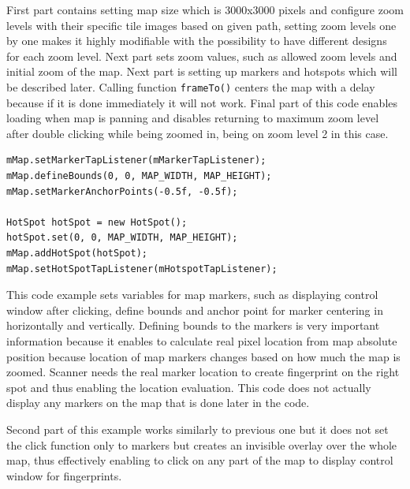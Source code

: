 First part contains setting map size which is 3000x3000 pixels and configure zoom levels with their specific tile images based on given path, setting zoom levels one by one makes it highly modifiable with the possibility to have different designs for each zoom level. Next part sets zoom values, such as allowed zoom levels and initial zoom of the map. Next part is setting up markers and hotspots which will be described later. Calling function \verb|frameTo()| centers the map with a delay because if it is done immediately it will not work. Final part of this code enables loading when map is panning and disables returning to maximum zoom level after double clicking while being zoomed in, being on zoom level 2 in this case.

\begin{lstlisting}[caption=Setup markers and hotspots]
mMap.setMarkerTapListener(mMarkerTapListener);
mMap.defineBounds(0, 0, MAP_WIDTH, MAP_HEIGHT);
mMap.setMarkerAnchorPoints(-0.5f, -0.5f);

HotSpot hotSpot = new HotSpot();
hotSpot.set(0, 0, MAP_WIDTH, MAP_HEIGHT);
mMap.addHotSpot(hotSpot);
mMap.setHotSpotTapListener(mHotspotTapListener);
\end{lstlisting}

This code example sets variables for map markers, such as displaying control window after clicking, define bounds and anchor point for marker centering in horizontally and vertically. Defining bounds to the markers is very important information because it enables to calculate real pixel location from map absolute position because location of map markers changes based on how much the map is zoomed. Scanner needs the real marker location to create fingerprint on the right spot and thus enabling the location evaluation. This code does not actually display any markers on the map that is done later in the code.

Second part of this example works similarly to previous one but it does not set the click function only to markers but creates an invisible overlay over the whole map, thus effectively enabling to click on any part of the map to display control window for fingerprints.